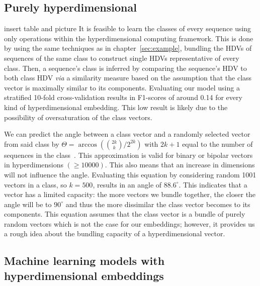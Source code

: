 \subsection*{Purely hyperdimensional}
insert table and picture
It is feasible to learn the classes of every sequence using only operations within the hyperdimensional computing framework. This is done by using the same techniques as in chapter~\ref{sec:example}, bundling the HDVs of sequences of the same class to construct single HDVs representative of every class. Then, a sequence's class is inferred by comparing the sequence's HDV to both class HDV \textit{via} a similarity measure based on the assumption that the class vector is maximally similar to its components. Evaluating our model using a stratified 10-fold cross-validation results in F1-scores of around 0.14 for every kind of hyperdimensional embedding. This low result is likely due to the possibility of oversaturation of the class vectors.

We can predict the angle between a class vector and a randomly selected vector from said class by $\Theta = \arccos({2k \choose k}/2^{2k})$ with $2k+1$ equal to the number of sequences in the class~\cite{sathdv}. This approximation is valid for binary or bipolar vectors in hyperdimensions $(\ge 10000)$. This also means that an increase in dimensions will not influence the angle. Evaluating this equation by considering random 1001 vectors in a class, so $k = 500$, results in an angle of $88.6^{\circ}$. This indicates that a vector has a limited capacity: the more vectors we bundle together, the closer the angle will be to $90^{\circ}$ and thus the more dissimilar the class vector becomes to its components. This equation assumes that the class vector is a bundle of purely random vectors which is not the case for our embeddings; however, it provides us a rough idea about the bundling capacity of a hyperdimensional vector.
\subsection*{Machine learning models with hyperdimensional embeddings}